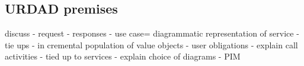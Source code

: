 \documentclass{llncs}
\begin{document}
\subsection{URDAD premises}

discuss
 - request - responses
 - use case= diagrammatic representation of service
 - tie ups
 - in
cremental population of value objects
 - user obligations
 - explain call activities - tied up to services
 - explain choice of diagrams
 - PIM

\end{document}
